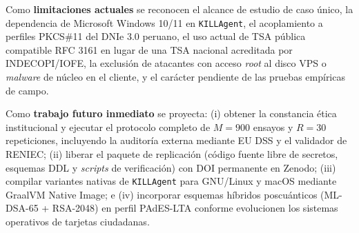 \documentclass[runningheads,twocolumn]{llncs}
\begin{document}
Como \textbf{limitaciones actuales} se reconocen el alcance de estudio de caso único, la dependencia de Microsoft Windows 10/11 en \texttt{KILLAgent}, el acoplamiento a perfiles PKCS\#11 del DNIe 3.0 peruano, el uso actual de TSA pública compatible RFC 3161 en lugar de una TSA nacional acreditada por INDECOPI/IOFE, la exclusión de atacantes con acceso \textit{root} al disco VPS o \textit{malware} de núcleo en el cliente, y el carácter pendiente de las pruebas empíricas de campo.

Como \textbf{trabajo futuro inmediato} se proyecta: (i) obtener la constancia ética institucional y ejecutar el protocolo completo de $M = 900$ ensayos y $R = 30$ repeticiones, incluyendo la auditoría externa mediante EU DSS y el validador de RENIEC; (ii) liberar el paquete de replicación (código fuente libre de secretos, esquemas DDL y \textit{scripts} de verificación) con DOI permanente en Zenodo; (iii) compilar variantes nativas de \texttt{KILLAgent} para GNU/Linux y macOS mediante GraalVM Native Image; e (iv) incorporar esquemas híbridos poscuánticos (ML-DSA-65 + RSA-2048) en perfil PAdES-LTA conforme evolucionen los sistemas operativos de tarjetas ciudadanas.
\end{document}

